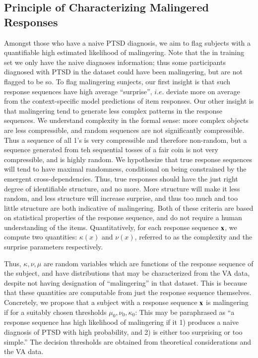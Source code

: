 \documentclass[onecolumn,10pt]{IEEEtran}
\begin{document}
\subsection*{Principle of Characterizing Malingered Responses}
Amongst those who have a naive PTSD diagnosis, we aim to flag subjects with  a quantifiable high estimated likelihood of malingering. Note that the in training set we only have the naive diagnoses information; thus some participants diagnosed with PTSD in the dataset could have been malingering, but are not flagged to be so. To flag malingering sunjects, our first insight  is that such response sequences  have high average ``surprise'', $i.e. $ deviate more on average from the context-specific model predictions of item responses. Our other insight is that malingering tend to generate  less complex patterns in the response sequences. We understand complexity in the formal sense: more complex objects are less compressible, and  random sequences are not significantly compressible. Thus a sequence of all 1's is very compressible and therefore non-random, but a sequence generated from teh sequential tosses of a fair coin is not very compressible, and is highly random. We hypothesize that true response sequences  will tend to have maximal randomness, conditional on  being constrained by the emergent cross-dependencies. Thus, true responses  should have the just right  degree of identifiable structure, and  no more. More structure will make it less random, and less structure will increase surprise, and thus too much and too little structure are both indicative of malingering. Both of these criteria are based on statistical properties of the response sequence, and do not require a human understanding of the items. Quantitatively, for each response sequence $\bm{\mathrm{x}}$, we compute two quantities: $\kappa(x)$ and  $\nu(x)$, referred to as the complexity  and the surprise parameters respectively.

Thus,  $\kappa, \nu, \mu$ are  random variables which are functions of the response sequence of the subject, and have distributions that may be characterized from the VA data, despite  not having designation of ``malingering'' in that  dataset. This is because that these quantities are computable from just the response sequence themselves. Concretely, we propose that a subject with a response sequence $\bm{\mathrm{x}}$  is malingering if for a suitably chosen thresholds $\mu_0,\nu_0, \kappa_0$:
This may be paraphrased as ``a response sequence has high likelihood of malingering if it 1)  produces a naive diagnosis of PTSD with high probability, and 2) is either too surprising or too simple.'' The decision thresholds are obtained from theoretical considerations and the VA data.
\end{document}
